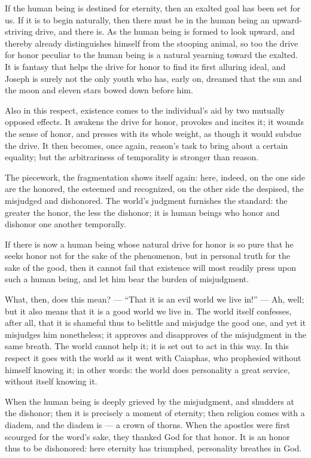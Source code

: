 \documentclass[12pt,a4paper]{book}
\begin{document}
If the human being is destined for eternity, then an exalted goal has been set for us. If it is to begin naturally, then there must be in the human being an upward-striving drive, and there is. As the human being is formed to look upward, and thereby already distinguishes himself from the stooping animal, so too the drive for honor peculiar to the human being is a natural yearning toward the exalted. It is fantasy that helps the drive for honor to find its first alluring ideal, and Joseph is surely not the only youth who has, early on, dreamed that the sun and the moon and eleven stars bowed down before him.

Also in this respect, existence comes to the individual's aid by two mutually opposed effects. It awakens the drive for honor, provokes and incites it; it wounds the sense of honor, and presses with its whole weight, as though it would subdue the drive. It then becomes, once again, reason's task to bring about a certain equality; but the arbitrariness of temporality is stronger than reason.

The piecework, the fragmentation shows itself again: here, indeed, on the one side are the honored, the esteemed and recognized, on the other
side the despised, the misjudged and dishonored. The world's judgment furnishes the standard: the greater the honor, the less the dishonor; it is human beings who honor and dishonor one another temporally.

If there is now a human being whose natural drive for honor is so pure that he seeks honor not for the sake of the phenomenon, but in personal truth for the sake of the good, then it cannot fail that existence will most readily press upon such a human being, and let him bear the burden of misjudgment.

What, then, does this mean? --- ``That it is an evil world we live in!'' --- Ah, well; but it also means that it is a good world we live in. The world itself confesses, after all, that it is shameful thus to belittle and misjudge the good one, and yet it misjudges him nonetheless; it approves and disapproves of the misjudgment in the same breath. The world cannot help it; it is set out to act in this way. In this respect it goes with the world as it went with Caiaphas, who prophesied without himself knowing it; in other words: the world does personality a great service, without itself knowing it.

When the human being is deeply grieved by the misjudgment, and shudders at the dishonor; then it is precisely a moment of eternity; then religion comes with a diadem, and the diadem is --- a crown of thorns. When the apostles were first scourged for the word's sake, they thanked God for that honor. It is an honor thus to be dishonored: here eternity has triumphed, personality breathes in God.
\end{document}
